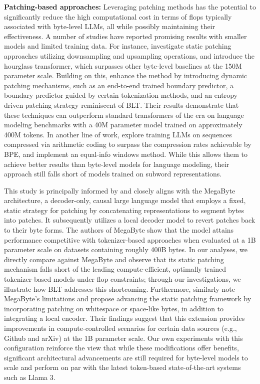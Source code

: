 \textbf{Patching-based approaches:} Leveraging patching methods has the potential to significantly reduce the high computational cost in terms of flops typically associated with byte-level LLMs, all while possibly maintaining their effectiveness. A number of studies have reported promising results with smaller models and limited training data. For instance, \cite{nawrot-etal-2022-hierarchical} investigate static patching approaches utilizing downsampling and upsampling operations, and introduce the hourglass transformer, which surpasses other byte-level baselines at the 150M parameter scale. Building on this, \cite{nawrot-etal-2023-efficient} enhance the method by introducing dynamic patching mechanisms, such as an end-to-end trained boundary predictor, a boundary predictor guided by certain tokenization methods, and an entropy-driven patching strategy reminiscent of {\textsc BLT}. Their results demonstrate that these techniques can outperform standard transformers of the era on language modeling benchmarks with a 40M parameter model trained on approximately 400M tokens. In another line of work, \cite{lester2024training} explore training LLMs on sequences compressed via arithmetic coding to surpass the compression rates achievable by BPE, and implement an equal-info windows method. While this allows them to achieve better results than byte-level models for language modeling, their approach still falls short of models trained on subword representations.

This study is principally informed by and closely aligns with the MegaByte~\citep{yu2023megabyte} architecture, a decoder-only, causal large language model that employs a fixed, static strategy for patching by concatenating representations to segment bytes into patches. It subsequently utilizes a local decoder model to revert patches back to their byte forms. The authors of MegaByte show that the model attains performance competitive with tokenizer-based approaches when evaluated at a 1B parameter scale on datasets containing roughly 400B bytes. In our analyses, we directly compare against MegaByte and observe that its static patching mechanism falls short of the leading compute-efficient, optimally trained tokenizer-based models under flop constraints; through our investigations, we illustrate how {\textsc BLT} addresses this shortcoming. Furthermore, \cite{slagle2024spacebyte} similarly note MegaByte's limitations and propose advancing the static patching framework by incorporating patching on whitespace or space-like bytes, in addition to integrating a local encoder. Their findings suggest that this extension provides improvements in compute-controlled scenarios for certain data sources (e.g., Github and arXiv) at the 1B parameter scale. Our own experiments with this configuration reinforce the view that while these modifications offer benefits, significant architectural advancements are still required for byte-level models to scale and perform on par with the latest token-based state-of-the-art systems such as Llama 3.

